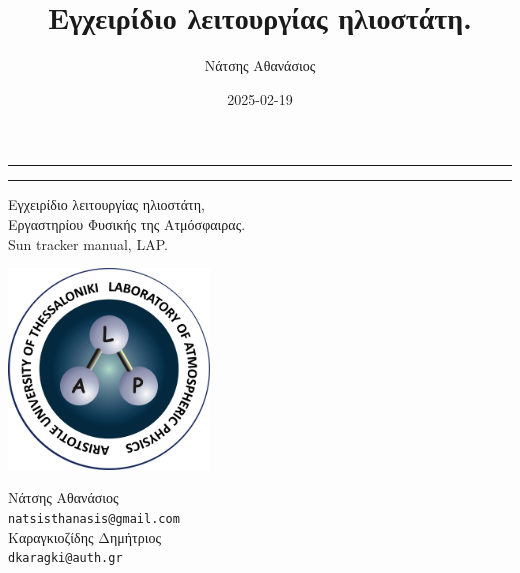 \documentclass[
  a4paper,
  twoside,
  titlepage,
  11pt]{article}
\title{Εγχειρίδιο λειτουργίας ηλιοστάτη.}
\author{Νάτσης Αθανάσιος}
\date{2025-02-19}
\numberwithin{equation}{section}
\numberwithin{figure}{section}
\numberwithin{table}{section}
\begin{document}
\begin{titlepage}
    \clearpage\thispagestyle{empty}
    \newlength{\drop} %
    \textheight %

    \rule{\textwidth}{1pt}\par %
    \vspace{2pt}\vspace{-\baselineskip} %
    \rule{\textwidth}{0.4pt}\par %

    \vspace{0.6\drop} %
    \centering %
        {\Huge  Εγχειρίδιο λειτουργίας ηλιοστάτη,}\\[0.5\baselineskip] %
        {\Large Εργαστηρίου Φυσικής της Ατμόσφαιρας.}\\[0.75\baselineskip] %
        {\Huge  Sun tracker manual, LAP.} %

    \vfill

\includegraphics[width=0.4\textwidth]{./figure/LAP3.jpg}

    \vfill

    {\Large Νάτσης Αθανάσιος} \\
    {\small\texttt{natsisthanasis@gmail.com}}\\
    \vspace{10pt}
    {\Large Καραγκιοζίδης Δημήτριος}\\
    {\small\texttt{dkaragki@auth.gr}}\\


\end{titlepage}
\end{document}
